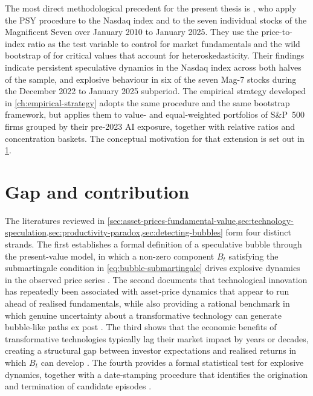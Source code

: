 The most direct methodological precedent for the present thesis is \citet{baselePhillipsShi2025}, who apply the PSY procedure to the Nasdaq index and to the seven individual stocks of the Magnificent Seven over January 2010 to January 2025. They use the price-to-index ratio as the test variable to control for market fundamentals and the wild bootstrap of \citet{harveyEtAl2016} for critical values that account for heteroskedasticity. Their findings indicate persistent speculative dynamics in the Nasdaq index across both halves of the sample, and explosive behaviour in six of the seven Mag-7 stocks during the December 2022 to January 2025 subperiod. The empirical strategy developed in \cref{ch:empirical-strategy} adopts the same procedure and the same bootstrap framework, but applies them to value- and equal-weighted portfolios of S\&P~500 firms grouped by their pre-2023 AI exposure, together with relative ratios and concentration baskets. The conceptual motivation for that extension is set out in \cref{sec:bubbles-gap-contribution}.


\section{Gap and contribution}
\label{sec:bubbles-gap-contribution}

The literatures reviewed in \cref{sec:asset-prices-fundamental-value,sec:technology-speculation,sec:productivity-paradox,sec:detecting-bubbles} form four distinct strands. The first establishes a formal definition of a speculative bubble through the present-value model, in which a non-zero component $B_t$ satisfying the submartingale condition in \cref{eq:bubble-submartingale} drives explosive dynamics in the observed price series \citep{phillipsShiYu2015a}. The second documents that technological innovation has repeatedly been associated with asset-price dynamics that appear to run ahead of realised fundamentals, while also providing a rational benchmark in which genuine uncertainty about a transformative technology can generate bubble-like paths ex post \citep{kindlebergerAliber2015,pastorVeronesi2009}. The third shows that the economic benefits of transformative technologies typically lag their market impact by years or decades, creating a structural gap between investor expectations and realised returns in which $B_t$ can develop \citep{brynjolfsson1993,david1990}. The fourth provides a formal statistical test for explosive dynamics, together with a date-stamping procedure that identifies the origination and termination of candidate episodes \citep{phillipsWuYu2011,phillipsShiYu2015a,phillipsShiYu2015b}.


